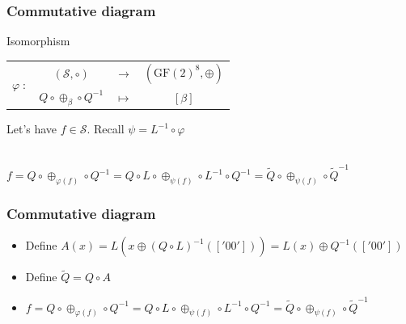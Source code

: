 \documentclass{beamer}
\newcommand{\gf}{\ensuremath{\text{GF}\left(2\right)}}
\begin{document}
\begin{frame}\frametitle{Commutative diagram}
    \begin{block}{Isomorphism}
    \begin{center}
    \begin{tabular}{ r  c c c }
	\multirow{2}{*}{$\varphi \; :$} & $(\mathcal{S}, \circ )$  & $\longrightarrow$ & $(\gf^8, \oplus)$ \\
	                                & $Q \circ \oplus_{\beta} \circ Q^{-1} $ & $\longmapsto$ & $\left[ \beta \right]$
    \end{tabular}
    \end{center}
    \end{block}
    
    \medskip
    Let's have $f \in \mathcal{S}$. Recall $\psi = L^{-1} \circ \varphi$ \\
    \bigskip
    
    \\
    $f = Q \circ \oplus_{\varphi(f)} \circ Q^{-1} = Q \circ L \circ \oplus_{\psi(f)} \circ L^{-1} \circ Q^{-1} = \widetilde{Q} \circ \oplus_{\psi(f)} \circ \widetilde{Q}^{-1}$
\end{frame}

\begin{frame}\frametitle{Commutative diagram}    
    \centerline{}
    \bigskip
    
    \begin{itemize}
     \item Define $A(x) = L(x \oplus (Q \circ L)^{-1}(['00'])) = L(x) \oplus Q^{-1}(['00'])$
     \item Define $\widetilde{Q} = Q \circ A$
     \item $f = Q \circ \oplus_{\varphi(f)} \circ Q^{-1} = Q \circ L \circ \oplus_{\psi(f)} \circ L^{-1} \circ Q^{-1} = \widetilde{Q} \circ \oplus_{\psi(f)} \circ \widetilde{Q}^{-1}$
    \end{itemize}
\end{frame}
\end{document}
